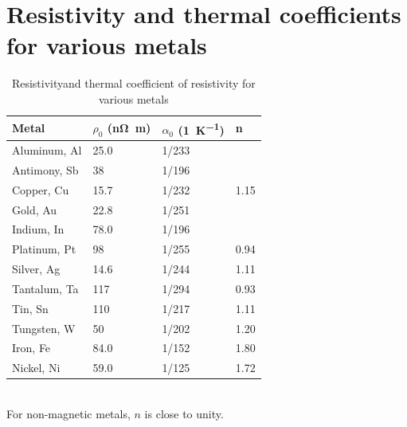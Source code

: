 \section{Resistivity and thermal coefficients for various metals}
\begin{table}[ht!]
    \centering
    \begin{tabular}{llll}
    \toprule
        Metal & $\rho_0$ (\si{\nano\ohm\meter}) & $\alpha_0$ (\si{1\per\kelvin}) & n \\ \midrule
        Aluminum, Al & 25.0 & 1/233 & \\
        Antimony, Sb & 38 & 1/196 & \\
        Copper, Cu & 15.7 & 1/232 & 1.15 \\
        Gold, Au & 22.8 & 1/251 & \\
        Indium, In & 78.0 & 1/196 & \\
        Platinum, Pt & 98 & 1/255 & 0.94 \\
        Silver, Ag & 14.6 & 1/244 & 1.11 \\
        Tantalum, Ta & 117 & 1/294 & 0.93 \\
        Tin, Sn & 110 & 1/217 & 1.11 \\
        Tungsten, W & 50 & 1/202 & 1.20 \\
        Iron, Fe & 84.0 & 1/152 & 1.80 \\
        Nickel, Ni & 59.0 & 1/125 & 1.72 \\
    \bottomrule
    \end{tabular} \\
    For non-magnetic metals, $n$ is close to unity.
    \caption{Resistivityand  thermal coefficient of resistivity for various metals}
    \label{app:resistivity}
\end{table}

